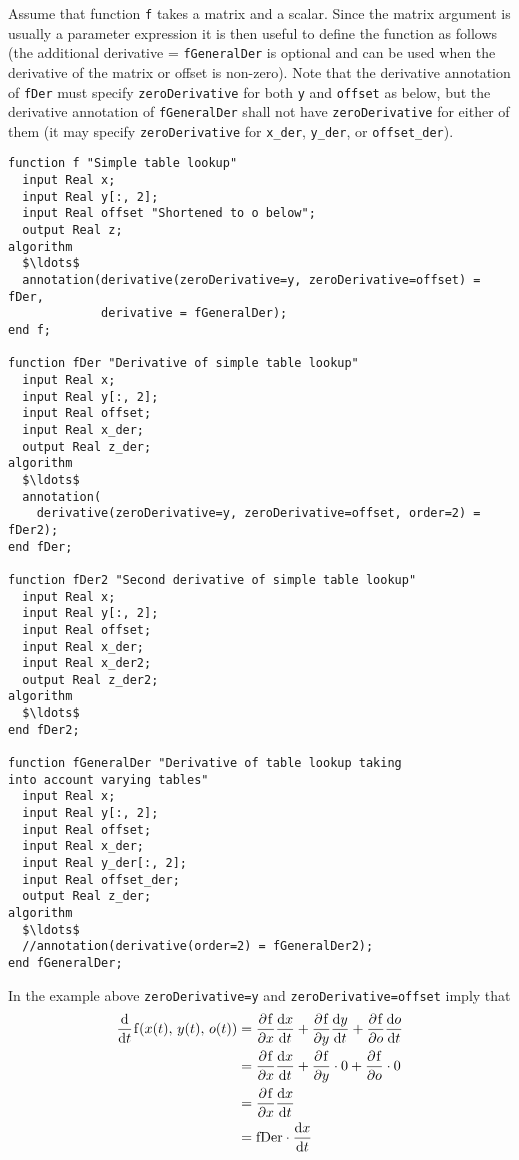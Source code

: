 \begin{nonnormative}
Assume that function \lstinline!f! takes a matrix and a scalar.
Since the matrix argument is usually a parameter expression it is then
useful to define the function as follows (the additional derivative =
\lstinline!fGeneralDer! is optional and can be used when the derivative of
the matrix or offset is non-zero). Note that the derivative annotation of \lstinline!fDer! must specify
\lstinline!zeroDerivative! for both \lstinline!y! and \lstinline!offset! as below, but the derivative annotation of \lstinline!fGeneralDer! shall not have
\lstinline!zeroDerivative! for either of them (it may specify \lstinline!zeroDerivative! for \lstinline!x_der!,
\lstinline!y_der!, or \lstinline!offset_der!).

\begin{lstlisting}[language=modelica]
function f "Simple table lookup"
  input Real x;
  input Real y[:, 2];
  input Real offset "Shortened to o below";
  output Real z;
algorithm
  $\ldots$
  annotation(derivative(zeroDerivative=y, zeroDerivative=offset) = fDer,
             derivative = fGeneralDer);
end f;

function fDer "Derivative of simple table lookup"
  input Real x;
  input Real y[:, 2];
  input Real offset;
  input Real x_der;
  output Real z_der;
algorithm
  $\ldots$
  annotation(
    derivative(zeroDerivative=y, zeroDerivative=offset, order=2) = fDer2);
end fDer;

function fDer2 "Second derivative of simple table lookup"
  input Real x;
  input Real y[:, 2];
  input Real offset;
  input Real x_der;
  input Real x_der2;
  output Real z_der2;
algorithm
  $\ldots$
end fDer2;

function fGeneralDer "Derivative of table lookup taking
into account varying tables"
  input Real x;
  input Real y[:, 2];
  input Real offset;
  input Real x_der;
  input Real y_der[:, 2];
  input Real offset_der;
  output Real z_der;
algorithm
  $\ldots$
  //annotation(derivative(order=2) = fGeneralDer2);
end fGeneralDer;
\end{lstlisting}
In the example above \lstinline!zeroDerivative=y! and \lstinline!zeroDerivative=offset! imply that
\begin{equation*}
\begin{aligned}
\udfrac{}{t}\text{\lstinline!f!}(x(t),\, y(t),\, o(t))
&= \pdfrac{\text{\lstinline!f!}}{x} \udfrac{x}{t} + \pdfrac{\text{\lstinline!f!}}{y} \udfrac{y}{t} + \pdfrac{\text{\lstinline!f!}}{o} \udfrac{o}{t}\\
&= \pdfrac{\text{\lstinline!f!}}{x} \udfrac{x}{t} + \pdfrac{\text{\lstinline!f!}}{y} \cdot 0 + \pdfrac{\text{\lstinline!f!}}{o} \cdot 0\\
&= \pdfrac{\text{\lstinline!f!}}{x} \udfrac{x}{t}\\
&= \text{\lstinline!fDer!} \cdot \udfrac{x}{t}
\end{aligned}
\end{equation*}
\end{nonnormative}

